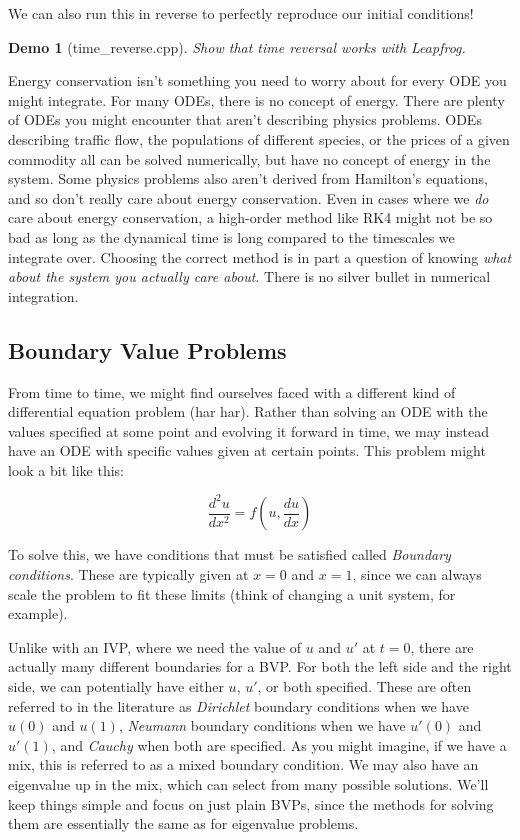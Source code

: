 \documentclass{article}
\theoremstyle{demo}
\newtheorem{demo}{Demo}[section]
\begin{document}
We can also run this in reverse to perfectly reproduce our initial conditions!
\begin{demo}[time\_reverse.cpp]
    Show that time reversal works with Leapfrog.
\end{demo}

Energy conservation isn't something you need to worry about for every ODE you
might integrate.  For many ODEs, there is no concept of energy. There are plenty
of ODEs you might encounter that aren't describing physics problems.  ODEs
describing traffic flow, the populations of different species, or the prices of
a given commodity all can be solved numerically, but have no concept of energy
in the system. Some physics problems also aren't derived from Hamilton's
equations, and so don't really care about energy conservation.  Even in cases
where we \textit{do} care about energy conservation, a high-order method like
RK4 might not be so bad as long as the dynamical time is long compared to the
timescales we integrate over.  Choosing the correct method is in part a question
of knowing \textit{what about the system you actually care about}.  There is no
silver bullet in numerical integration.

\subsection{Boundary Value Problems}
From time to time, we might find ourselves faced with a different kind of
differential equation problem (har har).  Rather than solving an ODE with the
values specified at some point and evolving it forward in time, we may instead
have an ODE with specific values given at certain points.  This problem might
look a bit like this: 

\begin{equation}
    \frac{d^2 u}{d x^2} = f\left(u, \frac{du}{dx}\right)
\end{equation}

To solve this, we have conditions that must be satisfied called \textit{Boundary
conditions}.  These are typically given at $x=0$ and $x=1$, since we can always
scale the problem to fit these limits (think of changing a unit system, for
example).

Unlike with an IVP, where we need the value of $u$ and $u'$ at $t=0$, there are
actually many different boundaries for a BVP.  For both the left side and the
right side, we can potentially have either $u$, $u'$, or both specified.  These
are often referred to in the literature as \textit{Dirichlet} boundary
conditions when we have $u(0)$ and $u(1)$, \textit{Neumann} boundary conditions when we
have $u'(0)$ and $u'(1)$, and \textit{Cauchy} when both are specified.  As you might
imagine, if we have a mix, this is referred to as a mixed boundary condition.
We may also have an eigenvalue up in the mix, which can select from many
possible solutions.  We'll keep things simple and focus on just plain BVPs,
since the methods for solving them are essentially the same as for eigenvalue
problems.
\end{document}
